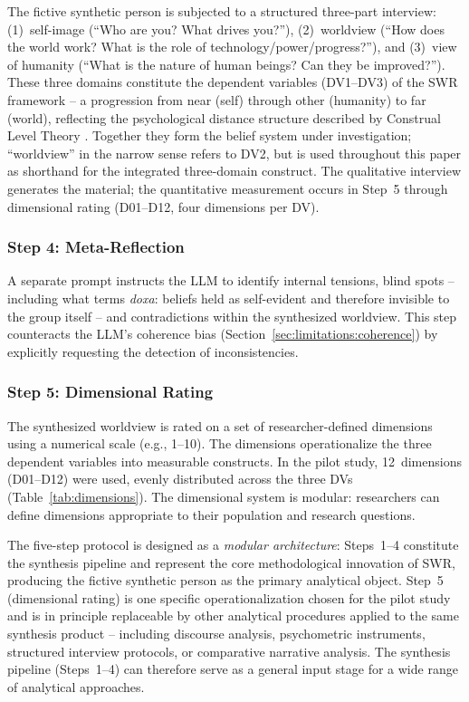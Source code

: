 \documentclass[11pt,a4paper]{article}
\begin{document}
The fictive synthetic person is subjected to a structured three-part interview: (1)~self-image (``Who are you? What drives you?''), (2)~worldview (``How does the world work? What is the role of technology/power/progress?''), and (3)~view of humanity (``What is the nature of human beings? Can they be improved?''). These three domains constitute the dependent variables (DV1--DV3) of the SWR framework -- a progression from near (self) through other (humanity) to far (world), reflecting the psychological distance structure described by Construal Level Theory \citep{TropeLiberman2010}. Together they form the belief system under investigation; ``worldview'' in the narrow sense refers to DV2, but is used throughout this paper as shorthand for the integrated three-domain construct. The qualitative interview generates the material; the quantitative measurement occurs in Step~5 through dimensional rating (D01--D12, four dimensions per DV).

\subsubsection{Step 4: Meta-Reflection}

A separate prompt instructs the LLM to identify internal tensions, blind spots -- including what \citet{Bourdieu1977} terms \emph{doxa}: beliefs held as self-evident and therefore invisible to the group itself -- and contradictions within the synthesized worldview. This step counteracts the LLM's coherence bias (Section~\ref{sec:limitations:coherence}) by explicitly requesting the detection of inconsistencies.

\subsubsection{Step 5: Dimensional Rating}

The synthesized worldview is rated on a set of researcher-defined dimensions using a numerical scale (e.g., 1--10). The dimensions operationalize the three dependent variables into measurable constructs. In the pilot study, 12~dimensions (D01--D12) were used, evenly distributed across the three DVs (Table~\ref{tab:dimensions}). The dimensional system is modular: researchers can define dimensions appropriate to their population and research questions.

The five-step protocol is designed as a \emph{modular architecture}: Steps~1--4 constitute the synthesis pipeline and represent the core methodological innovation of SWR, producing the fictive synthetic person as the primary analytical object. Step~5 (dimensional rating) is one specific operationalization chosen for the pilot study and is in principle replaceable by other analytical procedures applied to the same synthesis product -- including discourse analysis, psychometric instruments, structured interview protocols, or comparative narrative analysis. The synthesis pipeline (Steps~1--4) can therefore serve as a general input stage for a wide range of analytical approaches.
\end{document}
